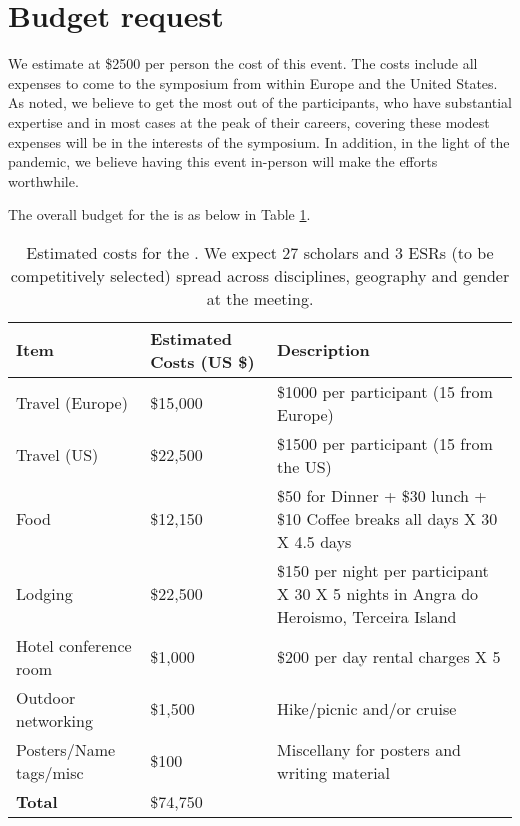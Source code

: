 \section{Budget request}

We estimate at \$2500 per person the cost of this event. The costs
include all expenses to come to the symposium from within Europe and the
United States. As noted, we believe to get the most out of the
participants, who have substantial expertise and in most cases at the
peak of their careers, covering these modest expenses will be in the
interests of the symposium. In addition, in the light of the pandemic,
we believe having this event in-person will make the efforts worthwhile.

The overall budget for the \symp is as below in Table
\ref{tab:budget}. 

\begin{table}[!h]
  \footnotesize{
    \centering    
    \begin{tabular}{|p{3.5cm}|p{1.6cm}|p{10cm}|}
    \hline 
    \rowcolor{Gray}
    \bfseries Item& \bfseries Estimated Costs (US \$)&\bfseries Description\\
    \hline
      Travel (Europe)& \$15,000 & \$1000 per participant (15 from Europe) \\
    \hline
      Travel (US)& \$22,500 & \$1500 per participant (15 from the US) \\
    \hline
      Food& \$12,150 & \$50 for Dinner + \$30 lunch + \$10 Coffee
                       breaks all days X 30 X 4.5 days\\
    \hline
      Lodging& \$22,500 & \$150 per night per participant X 30 X 5 nights in Angra do Heroismo, Terceira Island\\
    \hline
      Hotel conference room &\$1,000 & \$200 per day rental charges X 5\\
    \hline
      Outdoor networking& \$1,500 & Hike/picnic and/or cruise\\
    \hline
      Posters/Name tags/misc& \$100 & Miscellany for posters and writing material\\
    \hline
    \textbf{Total}& \$74,750 &\\
    \hline        
  \end{tabular}
  \caption{Estimated costs for the \sympe. We expect 27 scholars and 3
    ESRs (to be competitively selected) spread across disciplines,
    geography and gender at the meeting.}
  \label{tab:budget}
}
\end{table}

